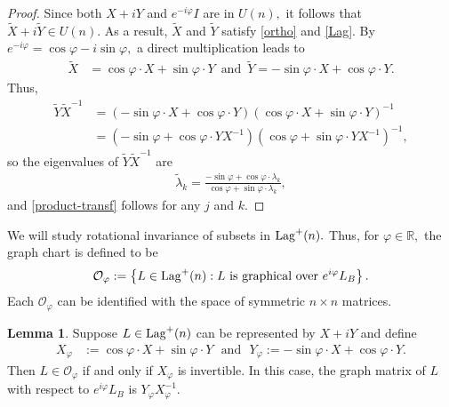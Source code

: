\documentclass[11pt]{amsart}
\numberwithin{equation}{section}
\theoremstyle{definition}
\theoremstyle{definition}
\newtheorem{lemma}[equation]{Lemma}
\newcommand{\set}[1]{\left\{#1\right\}}
\newcommand{\pr}[1]{\left(#1\right)}
\newcommand{\bb}[1]{\mathbb{#1}} \newcommand{\td}[1]{\widetilde{#1}}
\begin{document}
\begin{proof}
	Since both $X+iY$ and $e^{-i\varphi}I$ are in ${U}(n),$ it follows that $\td X + i\td Y\in {U}(n).$
	As a result, $\td X $ and $\td Y$ satisfy \eqref{ortho} and \eqref{Lag}.
	By $e^{-i\varphi}=\cos\varphi - i\sin\varphi,$ a direct multiplication leads to 
	\begin{align*}
	\td X
	&= \cos\varphi\cdot X 
	+ \sin\varphi\cdot Y \,
	\text{ and }\,
	\td Y
	= -\sin\varphi\cdot X 
	+ \cos\varphi\cdot Y.
	\end{align*}
	Thus, 
	\begin{align*}
	\td Y \td X^{-1}
	& = \pr{-\sin\varphi\cdot X 
		+ \cos\varphi\cdot Y}
	\pr{\cos\varphi\cdot X 
		+ \sin\varphi\cdot Y }^{-1}\\
	& = \pr{-\sin\varphi+ \cos\varphi \cdot Y X^{-1}} 
	\pr{\cos\varphi + \sin\varphi\cdot Y X^{-1}}^{-1} ,
	\end{align*}
	so the eigenvalues of $\td Y \td X^{-1}$ are
	\begin{align*}
	\td \lambda_{k}
	= \frac{-\sin\varphi + \cos\varphi\cdot \lambda_{k}}{\cos\varphi + \sin\varphi\cdot \lambda_k},
	\end{align*}
	and \eqref{product-transf} follows for any $j$ and $k.$
\end{proof}


We will study rotational invariance of subsets in ${\rm Lag}^+(n).$
Thus, for $\varphi\in\bb R,$ the graph chart is defined to be
\begin{align*}
\mathcal O_\varphi
:= \set{
	L\in {\rm Lag}^+(n)
	:
	L \text{ is graphical over } e^{i\varphi}L_B
}.
\end{align*}
Each $\mathcal O_\varphi$ can be identified with the space of symmetric $n\times n$ matrices. 

\begin{lemma}
	Suppose $L\in {\rm Lag}^+(n)$ can be represented by $X+iY$ and define
	\begin{equation}\label{X-varphi}
	\begin{split}
	X_\varphi&:=\cos\varphi\cdot X + \sin\varphi\cdot Y\,\,\text{ and }\,\,
	Y_\varphi:=-\sin\varphi\cdot X + \cos\varphi\cdot Y.
	\end{split}
	\end{equation} 
	Then $L\in \mathcal O_\varphi$ if and only if $X_\varphi$ is invertible. 
	In this case, the graph matrix of $L$ with respect to $e^{i\varphi}L_B$ is $Y_\varphi X_\varphi^{-1}$.
	
\end{lemma}
\end{document}
